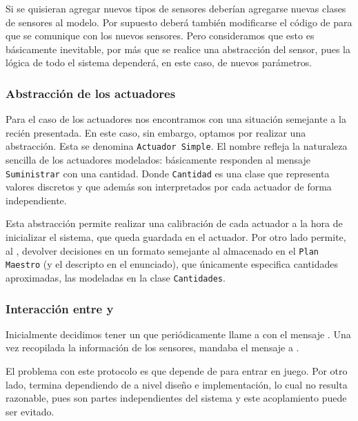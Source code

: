           Si se quisieran agregar nuevos tipos de sensores deber\'ian agregarse nuevas
          clases de sensores al modelo. Por supuesto deber\'a tambi\'en modificarse
          el c\'odigo de \condiciones{} para que se comunique
          con los nuevos sensores. Pero consideramos que esto es b\'asicamente inevitable,
          por m\'as que se realice una abstracci\'on del sensor, pues la l\'ogica
          de todo el sistema depender\'a, en este caso, de nuevos par\'ametros.

      \subsubsection{Abstracci\'on de los actuadores}
          Para el caso de los actuadores nos encontramos con una situaci\'on semejante
          a la reci\'en presentada. En este caso, sin embargo, optamos por realizar
          una abstracci\'on. Esta se denomina \texttt{Actuador Simple}. El nombre
          refleja la naturaleza sencilla de los actuadores modelados: b\'asicamente
          responden al mensaje \texttt{Suministrar} con una cantidad. Donde
          \texttt{Cantidad} es una clase que representa valores discretos y que adem\'as
          son interpretados por cada actuador de forma independiente.

          Esta abstracci\'on permite realizar una calibraci\'on de cada actuador a la
          hora de inicializar el sistema, que queda
          guardada en el actuador. Por otro lado permite, al \decisiones{},
          devolver decisiones en un formato semejante al almacenado en el
          \texttt{Plan Maestro} (y el descripto en el enunciado), que \'unicamente
          especifica cantidades aproximadas, las modeladas en la clase
          \texttt{Cantidades}.

      \subsubsection{Interacci\'on entre \decisiones{} y \condiciones{}}
          Inicialmente decidimos tener un \timer{} que peri\'odicamente llame a \condiciones{}
          con el mensaje \sensarCondiciones{}. Una vez recopilada la informaci\'on de los
          sensores, \condiciones{} mandaba el mensaje \tomarDecisiones{} a \decisiones{}.

          El problema con este protocolo es que \decisiones{} depende de \condiciones{}
          para entrar en juego. Por otro lado, \condiciones{} termina dependiendo de
          \condiciones{} a nivel dise\~no e implementaci\'on, lo cual no resulta razonable,
          pues son partes independientes del sistema y este acoplamiento puede ser evitado.

